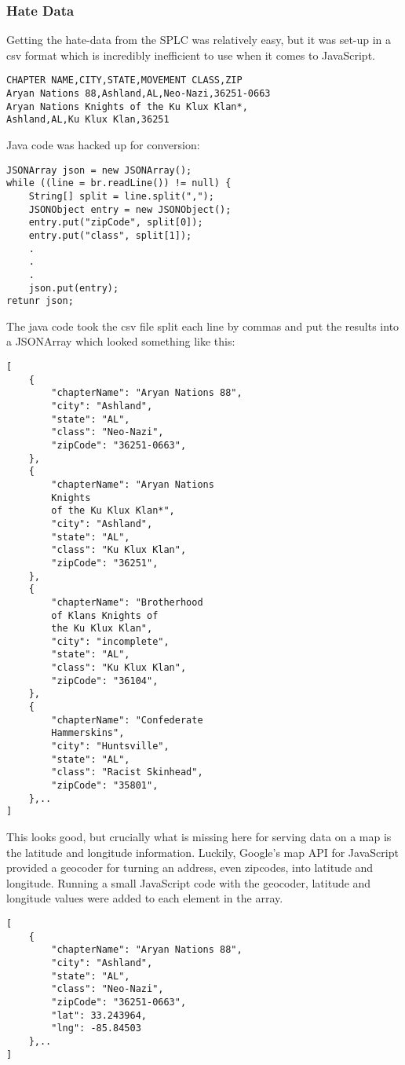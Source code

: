 \documentclass[twoside]{article}
\begin{document}
\begin{multicols}{2}
\subsubsection{Hate Data}
Getting the hate-data from the SPLC was relatively easy, but it was set-up in a csv format which is incredibly inefficient to use when it comes to JavaScript.
\begin{verbatim}
CHAPTER NAME,CITY,STATE,MOVEMENT CLASS,ZIP
Aryan Nations 88,Ashland,AL,Neo-Nazi,36251-0663
Aryan Nations Knights of the Ku Klux Klan*,
Ashland,AL,Ku Klux Klan,36251
\end{verbatim}
Java code was hacked up for conversion:
\begin{verbatim}
JSONArray json = new JSONArray();
while ((line = br.readLine()) != null) {
    String[] split = line.split(",");
    JSONObject entry = new JSONObject();
    entry.put("zipCode", split[0]);
    entry.put("class", split[1]);
    .
    .
    .
    json.put(entry);
retunr json;
\end{verbatim}
The java code took the csv file split each line by commas and put the results into a JSONArray which looked something like this:
\begin{verbatim}
[
    {
        "chapterName": "Aryan Nations 88",
        "city": "Ashland",
        "state": "AL",
        "class": "Neo-Nazi",
        "zipCode": "36251-0663",
    },
    {
        "chapterName": "Aryan Nations 
        Knights 
        of the Ku Klux Klan*",
        "city": "Ashland",
        "state": "AL",
        "class": "Ku Klux Klan",
        "zipCode": "36251",
    },
    {
        "chapterName": "Brotherhood 
        of Klans Knights of 
        the Ku Klux Klan",
        "city": "incomplete",
        "state": "AL",
        "class": "Ku Klux Klan",
        "zipCode": "36104",
    },
    {
        "chapterName": "Confederate 
        Hammerskins",
        "city": "Huntsville",
        "state": "AL",
        "class": "Racist Skinhead",
        "zipCode": "35801",
    },..
]
\end{verbatim}
This looks good, but crucially what is missing here for serving data on a map is the latitude and longitude information. Luckily, Google’s map API for JavaScript provided a geocoder for turning an address, even zipcodes, into latitude and longitude. Running a small JavaScript code with the geocoder, latitude and longitude values were added to each element in the array.
\begin{verbatim}
[
    {
        "chapterName": "Aryan Nations 88",
        "city": "Ashland",
        "state": "AL",
        "class": "Neo-Nazi",
        "zipCode": "36251-0663",
        "lat": 33.243964,
        "lng": -85.84503
    },..
]
\end{verbatim}


\end{multicols}
\end{document}
